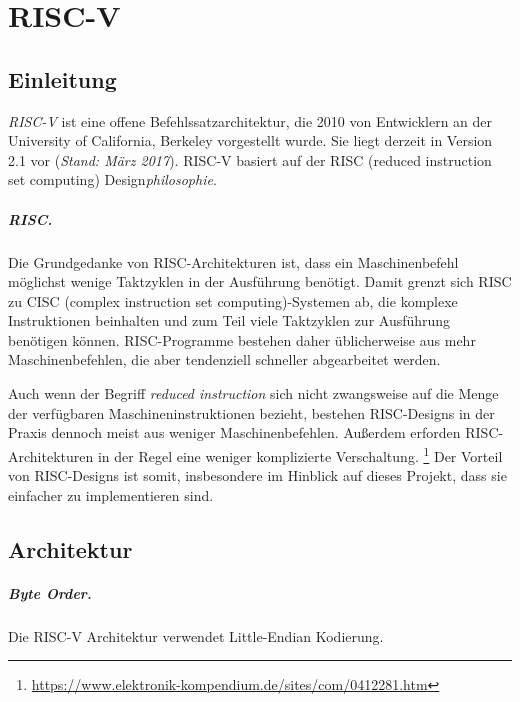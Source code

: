 \chapter{RISC-V} %
\label{RISC-V} %

\section{Einleitung}
\emph{RISC-V} ist eine offene Befehlssatzarchitektur, die 2010 von Entwicklern an der University of California, Berkeley vorgestellt wurde. Sie liegt derzeit in Version 2.1 vor (\textit{Stand: März 2017}). RISC-V basiert auf der RISC (reduced instruction set computing) Design\textit{philosophie}.

\paragraph{RISC.} Die Grundgedanke von RISC-Architekturen ist, dass ein Maschinenbefehl möglichst wenige Taktzyklen in der Ausführung benötigt. Damit grenzt sich RISC zu CISC (complex instruction set computing)-Systemen ab, die komplexe Instruktionen beinhalten und zum Teil viele Taktzyklen zur Ausführung benötigen können. RISC-Programme bestehen daher üblicherweise aus mehr Maschinenbefehlen, die aber tendenziell schneller abgearbeitet werden.

Auch wenn der Begriff \textit{reduced instruction} sich nicht zwangsweise auf die Menge der verfügbaren Maschineninstruktionen bezieht, bestehen RISC-Designs in der Praxis dennoch meist aus weniger Maschinenbefehlen. Außerdem erforden RISC-Architekturen in der Regel eine weniger komplizierte Verschaltung. \footnote{\url{https://www.elektronik-kompendium.de/sites/com/0412281.htm}} Der Vorteil von RISC-Designs ist somit, insbesondere im Hinblick auf dieses Projekt, dass sie einfacher zu implementieren sind.

\section{Architektur}
\label{subsec:Register}

\paragraph{Byte Order.} Die RISC-V Architektur verwendet Little-Endian Kodierung.

